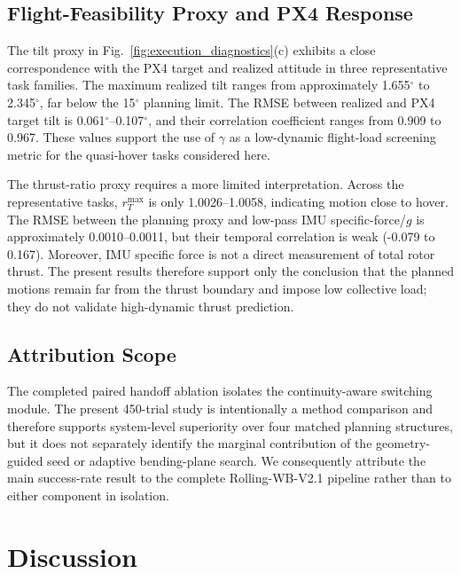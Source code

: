 \documentclass[journal,twoside]{IEEEtran}
\begin{document}
\subsection{Flight-Feasibility Proxy and PX4 Response}
The tilt proxy in Fig.~\ref{fig:execution_diagnostics}(c) exhibits a close correspondence with the PX4 target and realized attitude in three representative task families. The maximum realized tilt ranges from approximately 1.655$^\circ$ to 2.345$^\circ$, far below the 15$^\circ$ planning limit. The RMSE between realized and PX4 target tilt is 0.061$^\circ$--0.107$^\circ$, and their correlation coefficient ranges from 0.909 to 0.967. These values support the use of $\gamma$ as a low-dynamic flight-load screening metric for the quasi-hover tasks considered here.

The thrust-ratio proxy requires a more limited interpretation. Across the representative tasks, $r_T^{\max}$ is only 1.0026--1.0058, indicating motion close to hover. The RMSE between the planning proxy and low-pass IMU specific-force/$g$ is approximately 0.0010--0.0011, but their temporal correlation is weak (-0.079 to 0.167). Moreover, IMU specific force is not a direct measurement of total rotor thrust. The present results therefore support only the conclusion that the planned motions remain far from the thrust boundary and impose low collective load; they do not validate high-dynamic thrust prediction.

\subsection{Attribution Scope}
The completed paired handoff ablation isolates the continuity-aware switching module. The present 450-trial study is intentionally a method comparison and therefore supports system-level superiority over four matched planning structures, but it does not separately identify the marginal contribution of the geometry-guided seed or adaptive bending-plane search. We consequently attribute the main success-rate result to the complete Rolling-WB-V2.1 pipeline rather than to either component in isolation.

\section{Discussion}
\end{document}

